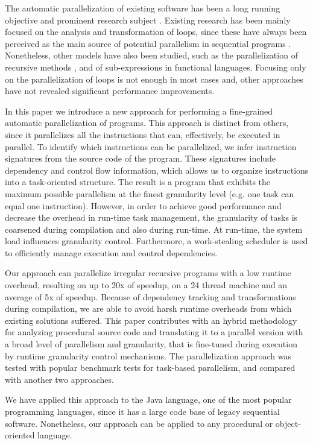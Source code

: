 \documentclass[smallextended]{svjour3}
\begin{document}
The automatic parallelization of existing software has been a long running objective and prominent research subject \cite{banerjee1993automatic}. Existing research has been mainly focused on the analysis and transformation of loops, since these have always been perceived as the main source of potential parallelism in sequential programs \cite{feautrier1996automatic}. Nonetheless, other models have also been studied, such as the parallelization of recursive methods \cite{bik1997automatically}, and of sub-expressions in functional languages. Focusing only on the parallelization of loops is not enough in most cases and, other approaches have not revealed significant performance improvements.


In this paper we introduce a new approach for performing a fine-grained automatic parallelization of programs. This approach is distinct from others, since it parallelizes all the instructions that can, effectively, be executed in parallel. To identify which instructions can be parallelized, we infer instruction signatures from the source code of the program. These signatures include dependency and control flow information, which allows us to organize instructions into a task-oriented structure. The result is a program that exhibits the maximum possible parallelism at the finest granularity level (e.g. one task can equal one instruction). However, in order to achieve good performance and decrease the overhead in run-time task management, the granularity of tasks is coarsened during compilation and also during run-time. At run-time, the system load influences granularity control. Furthermore, a work-stealing scheduler is used to efficiently manage execution and control dependencies.


Our approach can parallelize irregular recursive programs with a low runtime overhead, resulting on up to 20x of speedup, on a 24 thread machine and an average of 5x of speedup. Because of dependency tracking and transformations during compilation, we are able to avoid harsh runtime overheads from which existing solutions suffered. This paper contributes with an hybrid methodology for analyzing procedural source code and translating it to a parallel version with a broad level of parallelism and granularity, that is fine-tuned during execution by runtime granularity control mechanisms. The parallelization approach was tested with popular benchmark tests for task-based parallelism, and compared with another two approaches.


We have applied this approach to the Java language, one of the most popular programming languages, since it has a large code base of legacy sequential software. Nonetheless, our approach can be applied to any procedural or object-oriented language.
\end{document}

